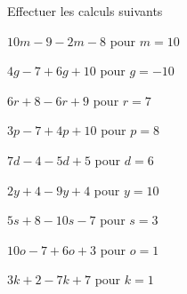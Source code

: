  Effectuer les calculs suivants

\begin{multicols}{3}


$10m-9-2m-8$ pour $m=10$



$4g-7+6g+10$ pour $g=-10$



$6r+8-6r+9$ pour $r=7$



$3p-7+4p+10$ pour $p=8$



$7d-4-5d+5$ pour $d=6$



$2y+4-9y+4$ pour $y=10$



$5s+8-10s-7$ pour $s=3$



$10o-7+6o+3$ pour $o=1$



$3k+2-7k+7$ pour $k=1$

\end{multicols}